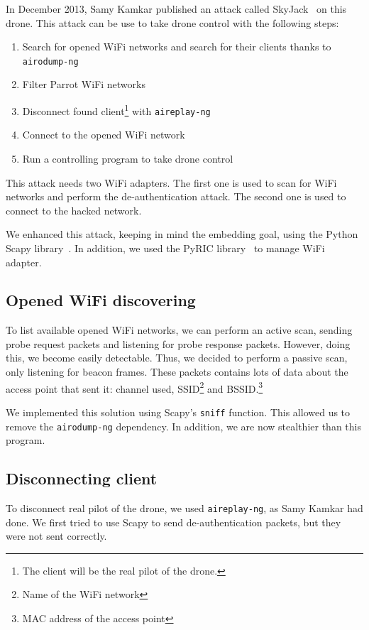 \documentclass[conference,a4paper]{IEEEtran}
\newcommand{\myv}[1]{\texttt{\small#1}}
\begin{document}
In December 2013, Samy Kamkar published an attack called SkyJack~\cite{bib:skyjack} on
this drone. This attack can be use to take drone control with the following steps:

\begin{enumerate}
  \item Search for opened WiFi networks and search for their clients thanks to
    \myv{airodump-ng}
  \item Filter Parrot WiFi networks
  \item Disconnect found client\footnote{The client will be the real pilot of the drone.}
    with \myv{aireplay-ng}
  \item Connect to the opened WiFi network
  \item Run a controlling program to take drone control
\end{enumerate}

This attack needs two WiFi adapters. The first one is used to scan for WiFi networks and
perform the de-authentication attack. The second one is used to connect to the hacked
network.

We enhanced this attack, keeping in mind the embedding goal, using the Python Scapy
library~\cite{bib:scapy}. In addition, we used the PyRIC library~\cite{bib:pyric} to
manage WiFi adapter.

\subsection{Opened WiFi discovering}
To list available opened WiFi networks, we can perform an active scan, sending probe
request packets and listening for probe response packets. However, doing this, we become
easily detectable. Thus, we decided to perform a passive scan, only listening for beacon
frames. These packets contains lots of data about the access point that sent it: channel
used, SSID\footnote{Name of the WiFi network} and BSSID.\footnote{MAC address of the access
point}

We implemented this solution using Scapy's \myv{sniff} function. This allowed us to
remove the \myv{airodump-ng} dependency. In addition, we are now stealthier than this
program.

\subsection{Disconnecting client}
To disconnect real pilot of the drone, we used \myv{aireplay-ng}, as Samy Kamkar had
done. We first tried to use Scapy to send de-authentication packets, but they were not sent
correctly.
\end{document}
